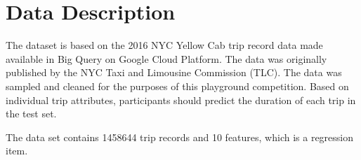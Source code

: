 













\section{Data Description} \label{sec-preliminaries}

The  dataset is based on the 2016 NYC Yellow Cab trip record data made available in Big Query on Google Cloud Platform. The data was originally published by the NYC Taxi and Limousine Commission (TLC). The data was sampled and cleaned for the purposes of this playground competition. Based on individual trip attributes, participants should predict the duration of each trip in the test set.

The data set contains 1458644 trip records and 10 features, which is a regression item.


